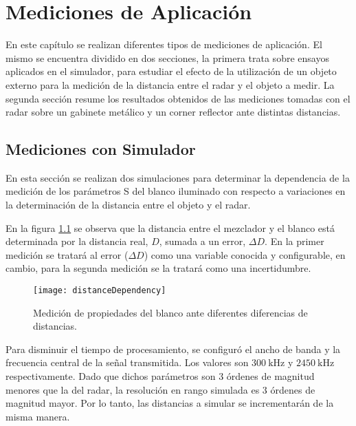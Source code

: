 \chapter{Mediciones de Aplicación} \label{ch:measurements}

\ifpdf
    \graphicspath{{Chapter5/Figs/Raster/}{Chapter5/Figs/PDF/}{Chapter5/Figs/}}
\else
    \graphicspath{{Chapter5/Figs/Vector/}{Chapter5/Figs/}}
\fi

En este capítulo se realizan diferentes tipos de mediciones de aplicación. El mismo se encuentra dividido en dos secciones, la primera trata sobre ensayos aplicados en el simulador, para estudiar el efecto de la utilización de un objeto externo para la medición de la distancia entre el radar y el objeto a medir. La segunda sección resume los resultados obtenidos de las mediciones tomadas con el radar sobre un gabinete metálico y un corner reflector ante distintas distancias.


\section{Mediciones con Simulador}

En esta sección se realizan dos simulaciones para determinar la dependencia de la medición de los parámetros S del blanco iluminado con respecto a variaciones en la determinación de la distancia entre el objeto y el radar. 

En la figura \ref{fig:DistDependencySim} se observa que la distancia entre el mezclador y el blanco está determinada por la distancia real, $D$, sumada a un error, $\Delta D$. En la primer medición se tratará al error ($\Delta D$) como una variable conocida y configurable, en cambio, para la segunda medición se la tratará como una incertidumbre.

\begin{figure}[H]
  \centering
  \texttt{[image: distanceDependency]}
  \caption{Medición de propiedades del blanco ante diferentes diferencias de distancias.}
  \label{fig:DistDependencySim}
\end{figure}

Para disminuir el tiempo de procesamiento, se configuró el ancho de banda y la frecuencia central de la señal transmitida. Los valores son $\SI{300}{\kHz}$ y $\SI{2450}{\kHz}$ respectivamente. Dado que dichos parámetros son 3 órdenes de magnitud menores que la del radar, la resolución en rango simulada es 3 órdenes de magnitud mayor. Por lo tanto, las distancias a simular se incrementarán de la misma manera.


